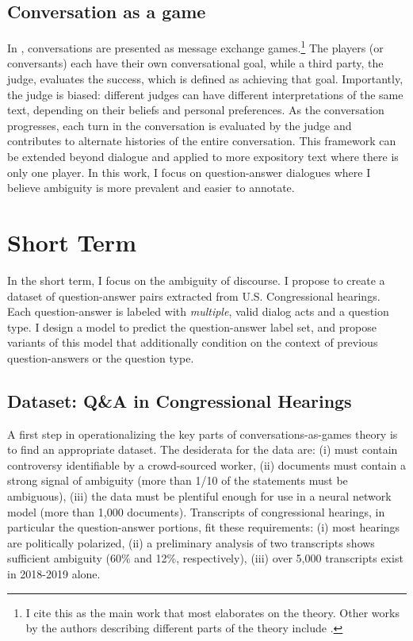 \subsection{Conversation as a game} In \citet{Asher:2018}, conversations are presented as message exchange games.\footnote{I cite this as the main work that most elaborates on the theory. Other works by the authors describing different parts of the theory include \citet{Asher:2016,Asher:2017}.} The players (or conversants) each have their own conversational goal, while a third party, the judge, evaluates the success, which is defined as achieving that goal. Importantly, the judge is biased: different judges can have different interpretations of the same text, depending on their beliefs and personal preferences. As the conversation progresses, each turn in the conversation is evaluated by the judge and contributes to alternate histories of the entire conversation. This framework can be extended beyond dialogue and applied to more expository text where there is only one player. In this work, I focus on question-answer dialogues where I believe ambiguity is more prevalent and easier to annotate. 

\section{Short Term}
In the short term, I focus on the ambiguity of discourse. I propose to create a dataset of question-answer pairs extracted from U.S. Congressional hearings. Each question-answer is labeled with \emph{multiple}, valid dialog acts and a question type. I design a model to predict the question-answer label set, and propose variants of this model that additionally condition on the context of previous question-answers or the question type.

\subsection{Dataset: Q\&A in Congressional Hearings}
A first step in operationalizing the key parts of conversations-as-games theory is to find an appropriate dataset. The desiderata for the data are: (i) must contain controversy identifiable by a crowd-sourced worker, (ii) documents must contain a strong signal of ambiguity (more than 1/10 of the statements must be ambiguous), (iii) the data must be plentiful enough for use in a neural network model (more than 1,000 documents). Transcripts of congressional hearings, in particular the question-answer portions, fit these requirements: (i) most hearings are politically polarized, (ii) a preliminary analysis of two transcripts shows sufficient ambiguity (60\% and 12\%, respectively), (iii) over 5,000 transcripts exist in 2018-2019 alone.

